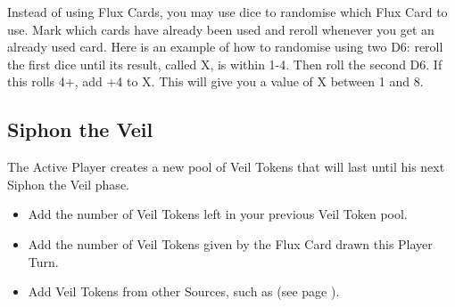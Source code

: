 \begin{center}
\def\FluxCardTitle{\Largefontsize\textbf{Flux Card 5}}
\def\FluxCardDice{%
\textbf{5 Magic Dice}\par
(both players)}
\def\FluxCardVeil{\textbf{9 Veil Tokens}\par
(Active Player)}
\def\FluxCardMiscast{}
\def\svgwidth{\fluxcardwidth}

\hspace{\fluxcardgap}
\def\FluxCardTitle{\Largefontsize\textbf{Flux Card 6}}
\def\FluxCardDice{%
\textbf{6 Magic Dice}\par
(both players)}
\def\FluxCardVeil{\textbf{5 Veil Tokens}\par
(Active Player)}
\def\FluxCardMiscast{}
\def\svgwidth{\fluxcardwidth}

\hspace{\fluxcardgap}
\def\FluxCardTitle{\Largefontsize\textbf{Flux Card 7}}
\def\FluxCardDice{%
\textbf{6 Magic Dice}\par
(both players)}
\def\FluxCardVeil{\textbf{7 Veil Tokens}\par
(Active Player)}
\def\FluxCardMiscast{}
\def\svgwidth{\fluxcardwidth}

\hspace{\fluxcardgap}
\def\FluxCardTitle{\Largefontsize\textbf{Flux Card 8}}
\def\FluxCardDice{%
\textbf{7 Magic Dice}\par
(both players)}
\def\FluxCardVeil{\textbf{7 Veil Tokens}\par
(Active Player)}
\def\FluxCardMiscast{\normalfontsize All Miscasts this phase suffer a \textbf{-1} Miscast Modifier}
\def\svgwidth{\fluxcardwidth}


\end{center}

Instead of using Flux Cards, you may use dice to randomise which Flux Card to use. Mark which cards have already been used and reroll whenever you get an already used card. Here is an example of how to randomise using two D6: reroll the first dice until its result, called X, is within 1-4. Then roll the second D6. If this rolls 4+, add +4 to X. This will give you a value of X between 1 and 8. 

\subsection{Siphon the Veil}

The Active Player creates a new pool of Veil Tokens that will last until his next Siphon the Veil phase.
\begin{itemize}[label={-}]
\item Add the number of Veil Tokens left in your previous Veil Token pool.
\item Add the number of Veil Tokens given by the Flux Card drawn this Player Turn.
\item Add Veil Tokens from other Sources, such as \channel{} (see page \pageref{channel}).
\end{itemize}

